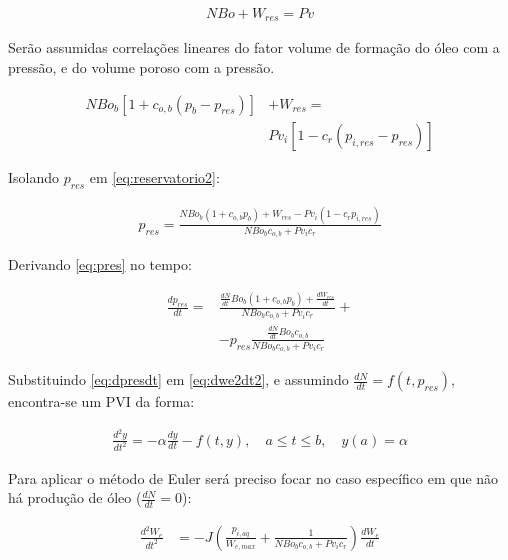 \documentclass[final,5p]{elsarticle}
\numberwithin{equation}{section}
\begin{document}
        \begin{align}
            N Bo + W_{res} = Pv  \label{eq:reservatorio}
        \end{align}

        Serão assumidas correlações lineares do fator volume de formação do óleo com a pressão, e do volume poroso com a pressão.

        \begin{align}
            N Bo_b [1+c_{o,b}(p_b-p_{res})] &+ W_{res} = \nonumber \\
            & Pv_i [1 - c_r (p_{i,res} - p_{res})]  \label{eq:reservatorio2}
        \end{align}

        Isolando $p_{res}$ em \ref{eq:reservatorio2}:

        \begin{align}
            p_{res} = \frac{N Bo_b (1+c_{o,b} p_b) + W_{res} - Pv_i (1 - c_r p_{i,res})}
            {N Bo_b c_{o,b} + Pv_i c_r }  \label{eq:pres}
        \end{align}

        Derivando \ref{eq:pres} no tempo:

        \begin{align}
            \frac{dp_{res}}{dt} =& \frac{\frac{dN}{dt} Bo_b (1+c_{o,b} p_b) + \frac{dW_{res}}{dt}}
            {N Bo_b c_{o,b} + Pv_i c_r} + \nonumber \\
            & -p_{res}\frac{\frac{dN}{dt} Bo_b c_{o,b}}{N Bo_b c_{o,b} + Pv_i c_r} \label{eq:dpresdt}
        \end{align}

        Substituindo \ref{eq:dpresdt} em \ref{eq:dwe2dt2}, e assumindo $\frac{dN}{dt} = f(t,p_{res})$, encontra-se um PVI da forma:

        \begin{align}
            \frac{d^2y}{dt^2} = -\alpha \frac{dy}{dt} - f(t,y), \quad a \leq t \leq b, \quad y(a) = \alpha \label{eq:pvi2}
        \end{align}


        Para aplicar o método de Euler será preciso focar no caso específico em que não há produção de óleo ($\frac{dN}{dt} = 0$):

        \begin{align}
            \frac{d^2W_e}{dt^2} &= - J \left(\frac{p_{i,aq}}{W_{e,max}} + \frac{1}{N Bo_b c_{o,b} + Pv_i c_r} \right)  \frac{dW_e}{dt} \label{eq:dwe2dt2res}
        \end{align}
\end{document}
